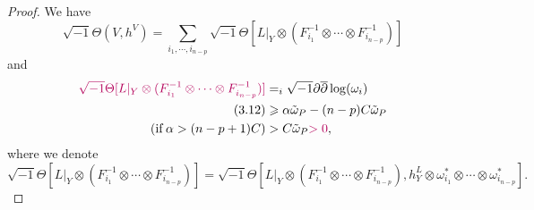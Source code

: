 \documentclass[lang=en,12pt]{beautybook}
\begin{document}
\begin{proof}
  We have
  \[
    \sqrt{- 1} \Theta (V, h^V)  =  \sum_{i_1, \cdots, i_{n - p}} \sqrt{-
      1} \Theta [L |_Y \otimes  (F_{i_1}^{- 1} \otimes \cdots
      \otimes F_{i_{n - p}}^{- 1})]
  \]
  and
  \begin{align*}
    {\color[HTML]{B4005A}\sqrt{- 1} \Theta [L |_Y \otimes
    (F_{i_1}^{- 1} \otimes \cdots \otimes F_{i_{n - p}}^{- 1})]} & =  \sum_i
    \sqrt{- 1} \partial \overline{\partial} \log (\omega_i)                                                       \\
    (3.12)                                                       & \geqslant  \alpha \tilde{\omega}_P - (n - p) C
    \tilde{\omega}_P                                                                                              \\
    (\tmop{if} \alpha > (n - p + 1) C)                           & >  C\tilde{\omega}_P
    {\color[HTML]{B4005A}> 0} ,
  \end{align*}
  where we denote
  \[\sqrt{- 1} \Theta [L |_Y \otimes
      (F_{i_1}^{- 1} \otimes \cdots \otimes F_{i_{n - p}}^{- 1})]=\sqrt{- 1} \Theta [L |_Y \otimes
      (F_{i_1}^{- 1} \otimes \cdots \otimes F_{i_{n - p}}^{- 1}), h_Y^L\otimes \omega_{i_1}^* \otimes\cdots\otimes\omega_{i_{n-p}}^*].\]


\end{proof}
\end{document}

